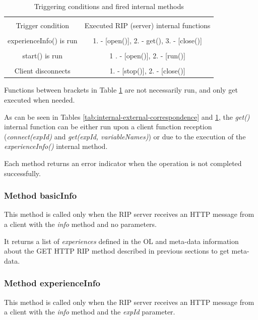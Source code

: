 \begin{table}[b!]
    \centering
    \begin{tabular}{|c|c|}
        \hline
        & \\Trigger condition & Executed RIP (server) internal functions \\
        \hline
        & \\experienceInfo() is run & 1. - [open()], 2. - get(), 3. - [close()] \\
        \hline
        & \\start() is run & 1 . - [open()], 2. - [run()] \\
        \hline
        & \\Client disconnects & 1. - [stop()], 2. - [close()] \\
        \hline
    \end{tabular}
    \caption{Triggering conditions and fired internal methods}
    \label{tab:trigerring-internal-correspondence}
\end{table}

Functions between brackets in Table \ref{tab:trigerring-internal-correspondence} are not necessarily run, and only get executed when needed.

As can be seen in Tables \ref{tab:internal-external-correspondence} and \ref{tab:trigerring-internal-correspondence}, the \textit{get()} internal function can be either run upon a client function reception (\textit{connect(expId)} and \textit{get(expId, variableNames)}) or due to the execution of the \textit{experienceInfo()} internal method. 

Each method returns an error indicator when the operation is not completed successfully.

\subsubsection{Method basicInfo}
This method is called only when the RIP server receives an HTTP message from a client with the \textit{info} method and no parameters.

It returns a list of \textit{experiences} defined in the OL and meta-data information about the GET HTTP RIP method described in previous sections to get meta-data.

\subsubsection{Method experienceInfo}
This method is called only when the RIP server receives an HTTP message from a client with the \textit{info} method and the \textit{expId} parameter.

